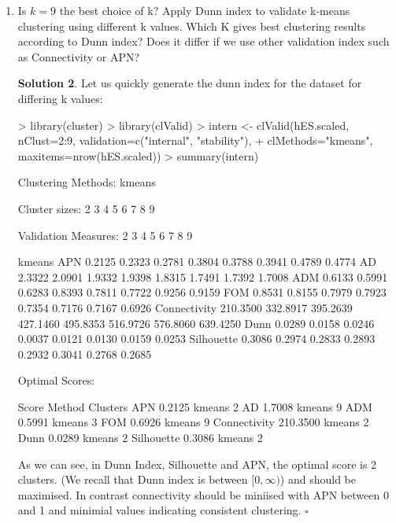 \documentclass[twoside]{article}
\theoremstyle{definition}
\newtheorem*{solutionT}{Solution}
\newenvironment{solution}{\begin{cBox}\begin{solutionT}}{\hfill{\scriptsize\ensuremath{\square}}\end{solutionT}\end{cBox}}
\theoremstyle{definition}
\begin{document}
\begin{enumerate}
\begin{solution}
\end{solution}
\item Is $k=9$ the best choice of k? Apply Dunn index to validate k-means clustering using
different k values. Which K gives best clustering results according to Dunn index?
Does it differ if we use other validation index such as Connectivity or APN?
\begin{solution}
Let us quickly generate the dunn index for the dataset for differing k values:

\begin{Schunk}
\begin{Sinput}
> library(cluster)
> library(clValid)
> intern <- clValid(hES.scaled, nClust=2:9, validation=c("internal", "stability"), 
+ clMethods="kmeans", maxitems=nrow(hES.scaled))
> summary(intern)
\end{Sinput}
\begin{Soutput}
Clustering Methods:
 kmeans 

Cluster sizes:
 2 3 4 5 6 7 8 9 

Validation Measures:
                            2        3        4        5        6        7        8        9
                                                                                            
kmeans APN             0.2125   0.2323   0.2781   0.3804   0.3788   0.3941   0.4789   0.4774
       AD              2.3322   2.0901   1.9332   1.9398   1.8315   1.7491   1.7392   1.7008
       ADM             0.6133   0.5991   0.6283   0.8393   0.7811   0.7722   0.9256   0.9159
       FOM             0.8531   0.8155   0.7979   0.7923   0.7354   0.7176   0.7167   0.6926
       Connectivity  210.3500 332.8917 395.2639 427.1460 495.8353 516.9726 576.8060 639.4250
       Dunn            0.0289   0.0158   0.0246   0.0037   0.0121   0.0130   0.0159   0.0253
       Silhouette      0.3086   0.2974   0.2833   0.2893   0.2932   0.3041   0.2768   0.2685

Optimal Scores:

             Score    Method Clusters
APN            0.2125 kmeans 2       
AD             1.7008 kmeans 9       
ADM            0.5991 kmeans 3       
FOM            0.6926 kmeans 9       
Connectivity 210.3500 kmeans 2       
Dunn           0.0289 kmeans 2       
Silhouette     0.3086 kmeans 2       
\end{Soutput}
\end{Schunk}
As we can see, in Dunn Index, Silhouette and APN, the optimal score is 2 clusters.  (We recall that Dunn index is between $[0,\infty)$) and should be maximised. In contrast connectivity should be miniised with APN between 0 and 1 and minimial values indicating consistent clustering.
\end{solution}
\end{enumerate}
\end{document}
